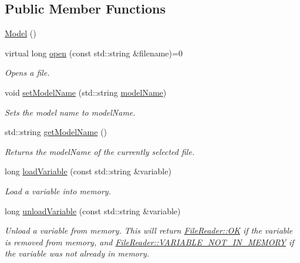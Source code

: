 \subsection*{Public Member Functions}
\begin{DoxyCompactItemize}
\item 
\hyperlink{classccmc_1_1_model_acf30994833c0f78c4b50cf4df90679dd}{Model} ()
\item 
virtual long \hyperlink{classccmc_1_1_model_a3c64dc635c2c1a2fe2f8efa2a3666282}{open} (const std\-::string \&filename)=0
\begin{DoxyCompactList}\small\item\em Opens a file. \end{DoxyCompactList}\item 
void \hyperlink{classccmc_1_1_model_a292717921c5bd7604901fb82c49275cf}{set\-Model\-Name} (std\-::string \hyperlink{classccmc_1_1_model_a6165e9aac67ae0cbe536e350d03161f3}{model\-Name})
\begin{DoxyCompactList}\small\item\em Sets the model name to model\-Name. \end{DoxyCompactList}\item 
std\-::string \hyperlink{classccmc_1_1_model_a7afc30ece1ad76d9e667d0d160e6723a}{get\-Model\-Name} ()
\begin{DoxyCompactList}\small\item\em Returns the model\-Name of the currently selected file. \end{DoxyCompactList}\item 
long \hyperlink{classccmc_1_1_model_a3f579f03a4cd21237705c268d1a5d3e9}{load\-Variable} (const std\-::string \&variable)
\begin{DoxyCompactList}\small\item\em Load a variable into memory. \end{DoxyCompactList}\item 
long \hyperlink{classccmc_1_1_model_a4e48492dcfeea1989b5d524e5359dd03}{unload\-Variable} (const std\-::string \&variable)
\begin{DoxyCompactList}\small\item\em Unload a variable from memory. This will return \hyperlink{classccmc_1_1_file_reader_aab750fd06ff3cb56cea326bae6be4fe3}{File\-Reader\-::\-O\-K} if the variable is removed from memory, and \hyperlink{classccmc_1_1_file_reader_a0fc7cfefa991aca0f26f2f533d4031ff}{File\-Reader\-::\-V\-A\-R\-I\-A\-B\-L\-E\-\_\-\-N\-O\-T\-\_\-\-I\-N\-\_\-\-M\-E\-M\-O\-R\-Y} if the variable was not already in memory. \end{DoxyCompactList}\item 

\end{DoxyCompactItemize}
